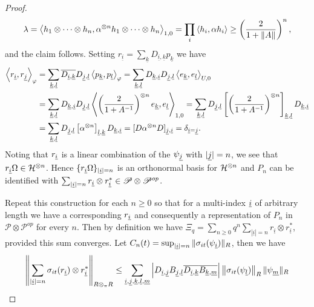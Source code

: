 \begin{proof}
	\begin{align*}
		\lambda= \left\langle h_1\otimes \cdots \otimes h_n, \alpha^{\otimes n}h_1\otimes \cdots \otimes h_n\right\rangle_{1,0}=\prod_i \left\langle h_i,\alpha h_i\right\rangle \geq \left(\frac{2}{1+\|A\|}\right)^n,
	\end{align*}
and the claim follows. Setting $r_{\underline{i}}=\sum_{\underline{k}} D_{\underline{i},\underline{k}} p_{\underline{k}}$ we have
	\begin{align*}
		\left\langle r_{\underline{i}}, r_{\underline{j}}\right\rangle_{\varphi} &= \sum_{\underline{k},\underline{l}} \overline{D_{\underline{i},\underline{k}}}D_{\underline{j},\underline{l}} \left\langle p_{\underline{k}},p_{\underline{l}}\right\rangle_{\varphi}=\sum_{\underline{k},\underline{l}} D_{\underline{k},\underline{i}} D_{\underline{j},\underline{l}} \left\langle e_{\underline{k}},e_{\underline{l}}\right\rangle_{U,0}\\
			& = \sum_{\underline{k},\underline{l}} D_{\underline{k},\underline{i}} D_{\underline{j},\underline{l}} \left\langle \left(\frac{2}{1+A^{-1}}\right)^{\otimes n} e_{\underline{k}}, e_{\underline{l}}\right\rangle_{1,0} = \sum_{\underline{k},\underline{l}} D_{\underline{j},\underline{l}} \left[\left(\frac{2}{1+A^{-1}}\right)^{\otimes n}\right]_{\underline{k},\underline{l}} D_{\underline{k},\underline{i}}\\
			&=\sum_{\underline{k},\underline{l}} D_{\underline{j},\underline{l}} \left[\alpha^{\otimes n}\right]_{\underline{l},\underline{k}} D_{\underline{k},\underline{i}}= [D\alpha^{\otimes n}D]_{\underline{j},\underline{i}}=\delta_{\underline{i}=\underline{j}}.
	\end{align*}
Noting that $r_{\underline{i}}$ is a linear combination of the $\psi_{\underline{j}}$ with $|\underline{j}|=n$, we see that $r_{\underline{i}}\Omega\in\mathcal H^{\otimes n}$. Hence $\{r_{\underline{i}}\Omega\}_{|\underline{i}|=n}$ is an orthonormal basis for $\mathcal H^{\otimes n}$ and $P_n$ can be identified with $\sum_{|\underline{i}|=n} r_{\underline{i}} \otimes r_{\underline{i}}^*\in\mathscr{P}\otimes\mathscr{P}^{op}$.\par
Repeat this construction for each $n\geq 0$ so that for a multi-index $\underline{i}$ of arbitrary length we have a corresponding $r_{\underline{i}}$ and consequently a representation of $P_n$ in $\mathscr{P}\otimes\mathscr{P}^{op}$ for every $n$. Then by definition we have $\Xi_q=\sum_{n\geq 0} q^n \sum_{|\underline{i}|=n} r_{\underline{i}}\otimes r_{\underline{i}}^*$, provided this sum converges. Let $C_n(t)=\sup_{|\underline{i}|=n}\|\sigma_{it}(\psi_{\underline{i}})\|_R$, then we have
	\begin{align*}
		\left\|\sum_{|\ul{i}|=n}  \sigma_{it}(r_{\ul{i}})\otimes r_{\ul{i}}^*\right\|_{R\otimes_\pi R}&\leq \sum_{\ul{i},\ul{j},\ul{k},\ul{l},\ul{m}} \left|D_{\ul{i},\ul{j}}B_{\ul{j},\ul{l}} \overline{D_{\ul{i},\ul{k}}}\overline{B_{\ul{k},\ul{m}}}\right| \left\| \sigma_{it}(\psi_{\ul{l}})\right\|_R \| \psi_{\ul{m}}\|_R\\

\end{align*}
\end{proof}
